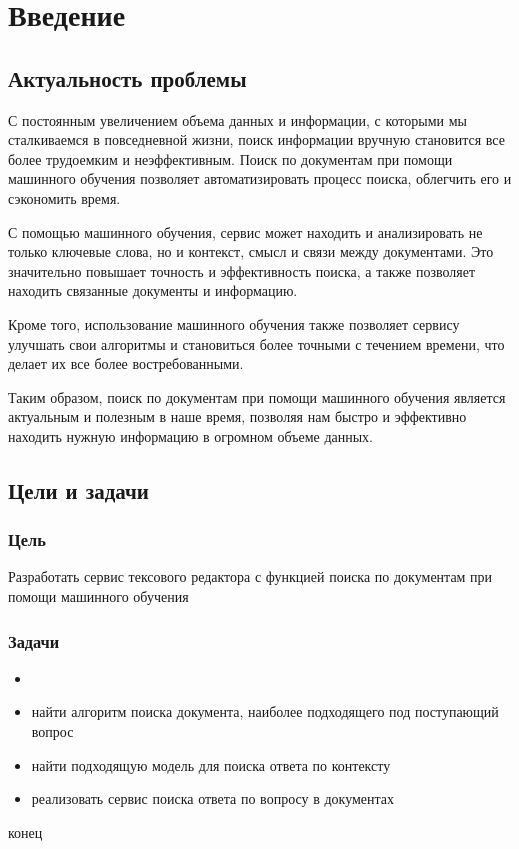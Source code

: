 \section{Введение}

\subsection{Актуальность проблемы}
С постоянным увеличением объема данных и информации, с которыми мы сталкиваемся в повседневной жизни, 
поиск информации вручную становится все более трудоемким и неэффективным. 
Поиск по документам при помощи машинного обучения позволяет автоматизировать процесс поиска, облегчить его и сэкономить время.

С помощью машинного обучения, сервис может находить и анализировать не только ключевые слова, но и контекст,
смысл и связи между документами. Это значительно повышает точность и эффективность поиска, 
а также позволяет находить связанные документы и информацию.

Кроме того, использование машинного обучения также позволяет сервису
улучшать свои алгоритмы и становиться более точными с течением времени, что делает их все более востребованными.

Таким образом, поиск по документам при помощи машинного обучения является
актуальным и полезным в наше время, позволяя нам быстро и эффективно находить нужную информацию в огромном объеме данных.


\subsection{Цели и задачи}
\subsubsection{Цель}
Разработать сервис тексового редактора с функцией поиска по документам при помощи машинного обучения
\subsubsection{Задачи}
\begin{itemize}
\item %
\item найти алгоритм поиска документа, наиболее подходящего под поступающий вопрос
\item найти подходящую модель для поиска ответа по контексту 
\item реализовать сервис поиска ответа по вопросу в документах
\end{itemize}
конец
